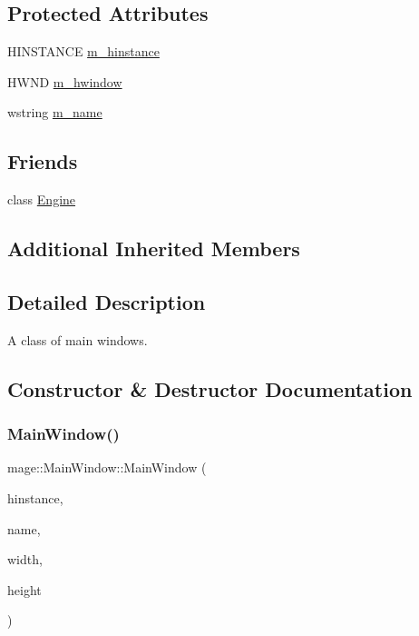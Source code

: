 \subsection*{Protected Attributes}
\begin{DoxyCompactItemize}
\item 
H\+I\+N\+S\+T\+A\+N\+CE \hyperlink{classmage_1_1_main_window_a389348c5949b2cb464a8236bfcff00ef}{m\+\_\+hinstance}
\item 
H\+W\+ND \hyperlink{classmage_1_1_main_window_afc9afabcf8a52d79f02c8352451863cc}{m\+\_\+hwindow}
\item 
wstring \hyperlink{classmage_1_1_main_window_a23d4e1b9499ab540b205af237710d783}{m\+\_\+name}
\end{DoxyCompactItemize}
\subsection*{Friends}
\begin{DoxyCompactItemize}
\item 
class \hyperlink{classmage_1_1_main_window_a3e1914489e4bed4f9f23cdeab34a43dc}{Engine}
\end{DoxyCompactItemize}
\subsection*{Additional Inherited Members}


\subsection{Detailed Description}
A class of main windows. 

\subsection{Constructor \& Destructor Documentation}
\hypertarget{classmage_1_1_main_window_a245e387a79d5957c01c8e10cc083b346}{}\label{classmage_1_1_main_window_a245e387a79d5957c01c8e10cc083b346} 
\subsubsection{\texorpdfstring{Main\+Window()}{MainWindow()}}
{\footnotesize\ttfamily mage\+::\+Main\+Window\+::\+Main\+Window (\begin{DoxyParamCaption}\item[{H\+I\+N\+S\+T\+A\+N\+CE}]{hinstance,  }\item[{wstring}]{name,  }\item[{L\+O\+NG}]{width,  }\item[{L\+O\+NG}]{height }\end{DoxyParamCaption})\hspace{0.3cm}{\ttfamily [protected]}}

